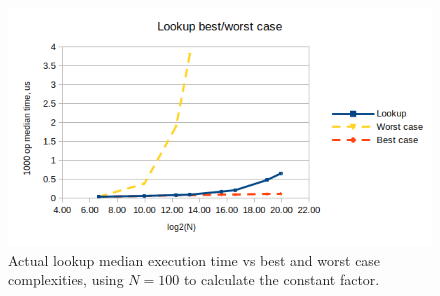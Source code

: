 \documentclass[a4paper,11pt]{article}
\begin{document}
    \begin{figure}[H]
        \centering
        \includegraphics[width=\textwidth]{lookup}
        \caption{Actual lookup median execution time vs best and worst case complexities, using $N=100$ to calculate the constant factor.}
    \end{figure}
\end{document}
